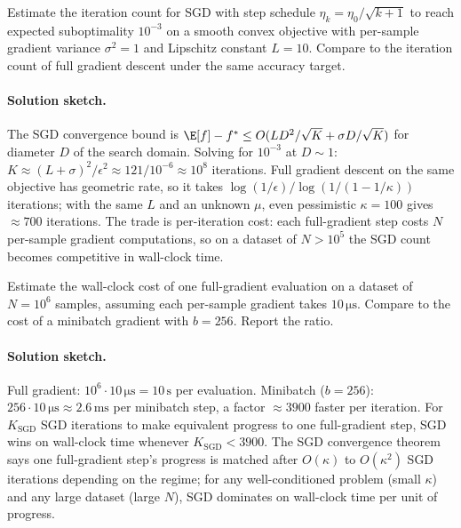 \begin{exercise}
Estimate the iteration count for SGD with step schedule $\eta_{k}
= \eta_{0} / \sqrt{k+1}$ to reach expected suboptimality
$10^{-3}$ on a smooth convex objective with per-sample gradient
variance $\sigma^{2} = 1$ and Lipschitz constant $L = 10$.
Compare to the iteration count of full gradient descent under
the same accuracy target.
\end{exercise}

\paragraph{Solution sketch.}
The SGD convergence bound is $\E[f] - f^{*} \leq O(L D^{2}/\sqrt{K}
+ \sigma D / \sqrt{K})$ for diameter $D$ of the search domain.
Solving for $10^{-3}$ at $D \sim 1$: $K \approx (L + \sigma)^{2} /
\epsilon^{2} \approx 121 / 10^{-6} \approx 10^{8}$ iterations. Full
gradient descent on the same objective has geometric rate, so it
takes $\log(1/\epsilon)/\log(1/(1 - 1/\kappa))$ iterations; with
the same $L$ and an unknown $\mu$, even pessimistic $\kappa = 100$
gives $\approx 700$ iterations. The trade is per-iteration cost:
each full-gradient step costs $N$ per-sample gradient
computations, so on a dataset of $N > 10^{5}$ the SGD count
becomes competitive in wall-clock time.

\begin{exercise}
Estimate the wall-clock cost of one full-gradient evaluation on
a dataset of $N = 10^{6}$ samples, assuming each per-sample
gradient takes $10\,\si{\micro\second}$. Compare to the cost of a
minibatch gradient with $b = 256$. Report the ratio.
\end{exercise}

\paragraph{Solution sketch.}
Full gradient: $10^{6} \cdot 10\,\si{\micro\second} = 10\,\si{\second}$
per evaluation. Minibatch ($b = 256$): $256 \cdot 10\,\si{\micro\second}
\approx 2.6\,\si{\milli\second}$ per minibatch step, a factor
$\approx 3900$ faster per iteration. For $K_{\text{SGD}}$ SGD
iterations to make equivalent progress to one full-gradient step,
SGD wins on wall-clock time whenever $K_{\text{SGD}} < 3900$. The
SGD convergence theorem says one full-gradient step's progress is
matched after $O(\kappa)$ to $O(\kappa^{2})$ SGD iterations
depending on the regime; for any well-conditioned problem (small
$\kappa$) and any large dataset (large $N$), SGD dominates on
wall-clock time per unit of progress.


